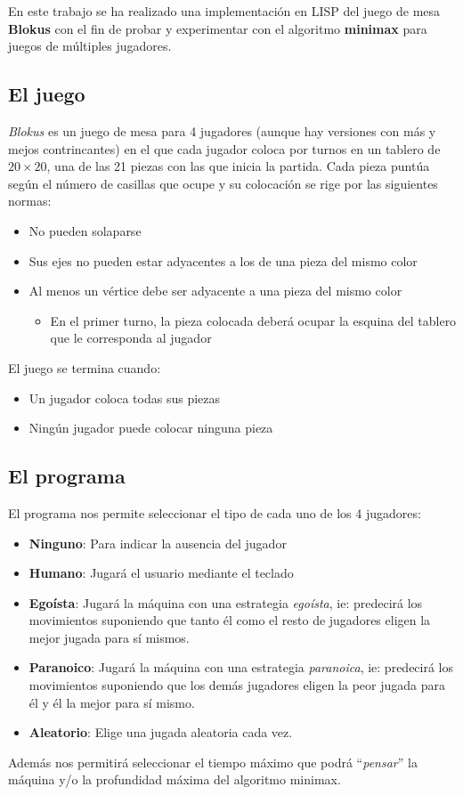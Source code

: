 En este trabajo se ha realizado una implementación en LISP del juego de mesa
\textbf{Blokus} con el fin de probar y experimentar con el algoritmo
\textbf{minimax} para juegos de múltiples jugadores.

\subsection{El juego}
\textsl{Blokus} es un juego de mesa para 4 jugadores (aunque hay versiones con
más y mejos contrincantes) en el que cada jugador coloca por turnos en un
tablero de $20\times20$, una de las 21 piezas con las que inicia la partida.
Cada pieza puntúa según el número de casillas que ocupe y su colocación se rige
por las siguientes normas:

\begin{itemize}
	\item No pueden solaparse
	\item Sus ejes no pueden estar adyacentes a los de una pieza del mismo
		color
	\item Al menos un vértice debe ser adyacente a una pieza del mismo color
	\begin{itemize}
		\item En el primer turno, la pieza colocada deberá ocupar la
			esquina del tablero que le corresponda al jugador
	\end{itemize}
\end{itemize}

El juego se termina cuando:
\begin{itemize}
	\item Un jugador coloca todas sus piezas
	\item Ningún jugador puede colocar ninguna pieza
\end{itemize}

\subsection{El programa}
\label{subsec:el-programa}
El programa nos permite seleccionar el tipo de cada uno de los 4 jugadores:
\begin{itemize}
	\item \textbf{Ninguno}: Para indicar la ausencia del jugador
	\item \textbf{Humano}: Jugará el usuario mediante el teclado
	\item \textbf{Egoísta}: Jugará la máquina con una estrategia
		\textsl{egoísta}, ie: predecirá los movimientos suponiendo que
		tanto él como el resto de jugadores eligen la mejor jugada para
		sí mismos.
	\item \textbf{Paranoico}: Jugará la máquina con una estrategia
		\textsl{paranoica}, ie: predecirá los movimientos suponiendo que
		los demás jugadores eligen la peor jugada para él y él la mejor
		para sí mismo.
	\item \textbf{Aleatorio}: Elige una jugada aleatoria cada vez.
\end{itemize}

Además nos permitirá seleccionar el tiempo máximo que podrá ``\textsl{pensar}''
la máquina y/o la profundidad máxima del algoritmo minimax.
